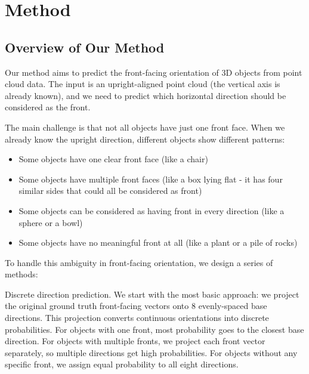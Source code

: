 \chapter{Method}
\section{Overview of Our Method}
Our method aims to predict the front-facing orientation of 3D objects from point cloud data. The input is an upright-aligned point cloud (the vertical axis is already known), and we need to predict which horizontal direction should be considered as the front.

The main challenge is that not all objects have just one front face. When we already know the upright direction, different objects show different patterns:
\begin{itemize}
    \item Some objects have one clear front face (like a chair)
    \item Some objects have multiple front faces (like a box lying flat - it has four similar sides that could all be considered as front)
    \item Some objects can be considered as having front in every direction (like a sphere or a bowl)
    \item Some objects have no meaningful front at all (like a plant or a pile of rocks)
\end{itemize}
To handle this ambiguity in front-facing orientation, we design a series of methods:

Discrete direction prediction. We start with the most basic approach: we project the original ground truth front-facing vectors onto 8 evenly-spaced base directions. This projection converts continuous orientations into discrete probabilities. For objects with one front, most probability goes to the closest base direction. For objects with multiple fronts, we project each front vector separately, so multiple directions get high probabilities. For objects without any specific front, we assign equal probability to all eight directions. 

